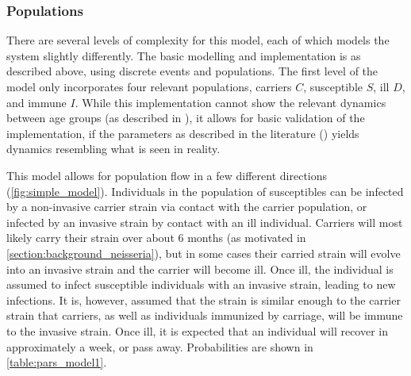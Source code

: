 \documentclass[10pt,a4paper]{article}
\begin{document}
%
%
%
%
%
%

\subsubsection{Populations}
There are several levels of complexity for this model, each of which models the system slightly differently. The basic modelling and implementation is as described above, using discrete events and populations. The first level of the model only incorporates four relevant populations, carriers $C$, susceptible $S$, ill $D$, and immune $I$. While this implementation cannot show the relevant dynamics between age groups (as described in \cite{?}), it allows for basic validation of the implementation, if the parameters as described in the literature (\cite{?}) yields dynamics resembling what is seen in reality.

This model allows for population flow in a few different directions (\cref{fig:simple_model}). Individuals in the population of susceptibles can be infected by a non-invasive carrier strain via contact with the  carrier population, or infected by an invasive strain by contact with an ill individual. Carriers will most likely carry their strain over about 6 months (as motivated in \cref{section:background_neisseria}), but in some cases their carried strain will evolve into an invasive strain and the carrier will become ill. Once ill, the individual is assumed to infect susceptible individuals with an invasive strain, leading to new infections. It is, however, assumed that the strain is similar enough to the carrier strain that carriers, as well as individuals immunized by carriage, will be immune to the invasive strain. Once ill, it is expected that an individual will recover in approximately a week, or pass away. Probabilities are shown in \cref{table:pars_model1}.
\end{document}
